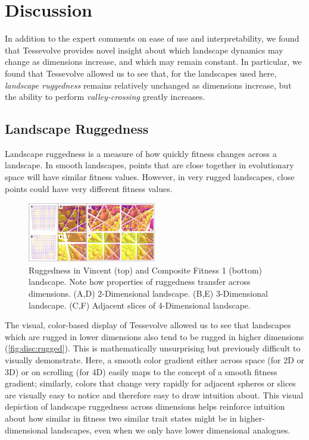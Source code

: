 \section{Discussion}
In addition to the expert comments on ease of use and interpretability, we found that Tessevolve provides novel insight about which landscape dynamics may change as dimensions increase, and which may remain constant. In particular, we found that Tessevolve allowed us to see that, for the landscapes used here, \textit{landscape ruggedness} remains relatively unchanged as dimensions increase, but the ability to perform \textit{valley-crossing} greatly increases.

\subsection{Landscape Ruggedness}

Landscape ruggedness is a measure of how quickly fitness changes across a landscape. In smooth landscapes, points that are close together in evolutionary space will have similar fitness values. However, in very rugged landscapes, close points could have very different fitness values. 

\begin{figure}
    \centering
    \includegraphics[width=0.5\textwidth]{chapters/3-vr-viz/figs/rugged.png}
    \caption{Ruggedness in Vincent (top) and Composite Fitness 1 (bottom) landscape. Note how properties of ruggedness transfer across dimensions. (A,D) 2-Dimensional landscape. (B,E) 3-Dimensional landscape. (C,F) Adjacent slices of 4-Dimensional landscape. }
    \label{fig:disc:rugged}
\end{figure}

The visual, color-based display of Tessevolve allowed us to see that landscapes which are rugged in lower dimensions also tend to be rugged in higher dimensions (\autoref{fig:disc:rugged}). This is mathematically unsurprising but previously difficult to visually demonstrate. Here, a smooth color gradient either across space (for 2D or 3D) or on scrolling (for 4D) easily maps to the concept of a smooth fitness gradient; similarly, colors that change very rapidly for adjacent spheres or slices are visually easy to notice and therefore easy to draw intuition about. This visual depiction of landscape ruggedness across dimensions helps reinforce intuition about how similar in fitness two similar trait states might be in higher-dimensional landscapes, even when we only have lower dimensional analogues. 

